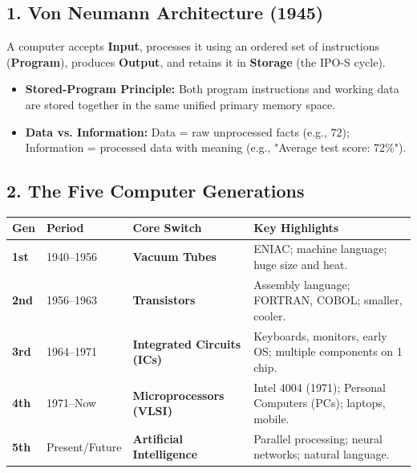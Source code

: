 \documentclass[a4paper,11pt]{article}
\begin{document}
\subsection{1. Von Neumann Architecture (1945)}
\begin{conceptbox}
A computer accepts \textbf{Input}, processes it using an ordered set of instructions (\textbf{Program}), produces \textbf{Output}, and retains it in \textbf{Storage} (the IPO-S cycle).
\begin{itemize}[leftmargin=5mm]
    \item \textbf{Stored-Program Principle:} Both program instructions and working data are stored together in the same unified primary memory space.
    \item \textbf{Data vs. Information:} Data = raw unprocessed facts (e.g., $72$); Information = processed data with meaning (e.g., "Average test score: 72\%").
\end{itemize}
\end{conceptbox}

\subsection{2. The Five Computer Generations}
\begin{center}
\small
\renewcommand{\arraystretch}{1.25}
\begin{tabular}{@{}l l l p{5.5cm}@{}}
\toprule
\textbf{Gen} & \textbf{Period} & \textbf{Core Switch} & \textbf{Key Highlights} \\
\midrule
\textbf{1st} & 1940--1956 & \textbf{Vacuum Tubes} & ENIAC; machine language; huge size and heat. \\
\textbf{2nd} & 1956--1963 & \textbf{Transistors} & Assembly language; FORTRAN, COBOL; smaller, cooler. \\
\textbf{3rd} & 1964--1971 & \textbf{Integrated Circuits (ICs)} & Keyboards, monitors, early OS; multiple components on 1 chip. \\
\textbf{4th} & 1971--Now & \textbf{Microprocessors (VLSI)} & Intel 4004 (1971); Personal Computers (PCs); laptops, mobile. \\
\textbf{5th} & Present/Future & \textbf{Artificial Intelligence} & Parallel processing; neural networks; natural language. \\
\bottomrule
\end{tabular}
\end{center}
\end{document}
